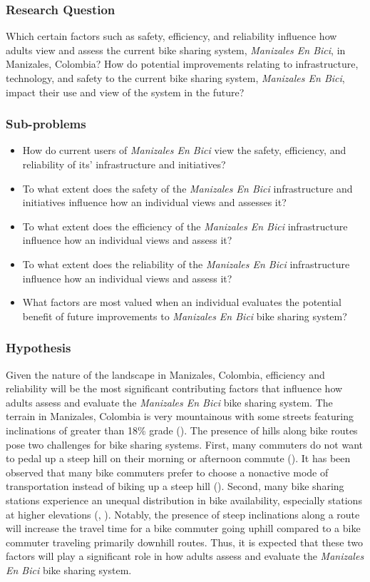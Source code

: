 \documentclass[12pt]{article}
\begin{document}
\subsubsection*{Research Question}
Which certain factors such as safety, efficiency, and reliability influence how adults view and assess the current bike sharing system, \textit{Manizales En Bici}, in Manizales, Colombia? How do potential improvements relating to infrastructure, technology, and safety to the current bike sharing system, \textit{Manizales En Bici}, impact their use and view of the system in the future?

\subsubsection*{Sub-problems}
\begin{itemize}
    \item How do current users of \textit{Manizales En Bici} view the safety, efficiency, and reliability of its' infrastructure and initiatives?
    \item To what extent does the safety of the \textit{Manizales En Bici} infrastructure and initiatives influence how an individual views and assesses it?
    \item To what extent does the efficiency of the \textit{Manizales En Bici} infrastructure influence how an individual views and assess it?
    \item To what extent does the reliability of the \textit{Manizales En Bici} infrastructure influence how an individual views and assess it?
    \item What factors are most valued when an individual evaluates the potential benefit of future improvements to \textit{Manizales En Bici} bike sharing system?
\end{itemize}
\subsubsection*{Hypothesis}
Given the nature of the landscape in Manizales, Colombia, efficiency and reliability will be the most significant contributing factors that influence how adults assess and evaluate the \textit{Manizales En Bici} bike sharing system. The terrain in Manizales, Colombia is very mountainous with some streets featuring inclinations of greater than 18\% grade (\cite{cardona2017analisis}). The presence of hills along bike routes pose two challenges for bike sharing systems. First, many commuters do not want to pedal up a steep hill on their morning or afternoon commute (\cite{midgley_2011}). It has been observed that many bike commuters prefer to choose a nonactive mode of transportation instead of biking up a steep hill (\cite{midgley_2011}). Second, many bike sharing stations experience an unequal distribution in bike availability, especially stations at higher elevations (\cite{midgley_2011}, \cite{HealthyRidePGHPSG}). Notably, the presence of steep inclinations along a route will increase the travel time for a bike commuter going uphill compared to a bike commuter traveling primarily downhill routes. Thus, it is expected that these two factors will play a significant role in how adults assess and evaluate the \textit{Manizales En Bici} bike sharing system.
\end{document}
